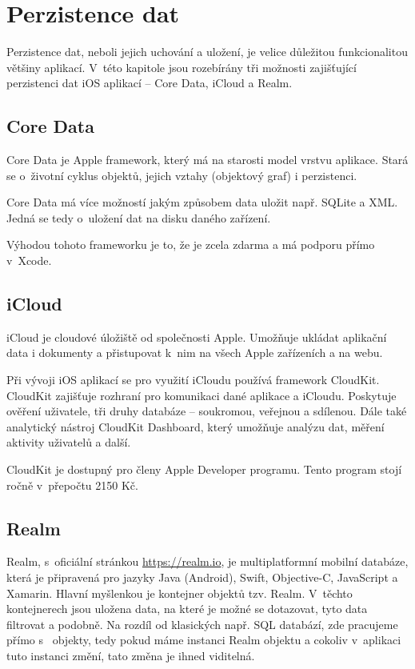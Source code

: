\documentclass[thesis=M,czech]{FITthesis}[2012/06/26]
\begin{document}
\section{Perzistence dat}
Perzistence dat, neboli jejich uchování a uložení, je velice důležitou funkcionalitou většiny aplikací. V~této kapitole jsou rozebírány tři možnosti zajišťující perzistenci dat iOS aplikací -- Core Data, iCloud a Realm.

\subsection{Core Data}
Core Data je Apple framework, který má na starosti model vrstvu aplikace. Stará se o~životní cyklus objektů, jejich vztahy (objektový graf) i perzistenci. \cite{coredata}

Core Data má více možností jakým způsobem data uložit např. SQLite a XML. Jedná se tedy o~uložení dat na disku daného zařízení.  \cite{CoreDataPersistentTypes}

Výhodou tohoto frameworku je to, že je zcela zdarma a má podporu přímo v~Xcode. \cite{CoreDataXcode}

\subsection{iCloud}
iCloud je cloudové úložiště od společnosti Apple. Umožňuje ukládat aplikační data i dokumenty a přistupovat k~nim na všech Apple zařízeních a na webu. \cite{iCloud}

Při vývoji iOS aplikací se pro využití iCloudu používá framework CloudKit. CloudKit zajišťuje rozhraní pro komunikaci dané aplikace a iCloudu. \cite{CloudKitDoc} Poskytuje ověření uživatele, tři druhy databáze -- soukromou, veřejnou a sdílenou. Dále také analytický nástroj CloudKit Dashboard, který umožňuje analýzu dat, měření aktivity uživatelů a další. \cite{CloudKit}

CloudKit je dostupný pro členy Apple Developer programu. \cite{AppleDeveloperProgram} Tento program stojí ročně v~přepočtu 2150 Kč. \cite{AppleDeveloperProgramPrice} 

\subsection{Realm}
Realm, s~oficiální stránkou \url{https://realm.io}, je multiplatformní mobilní databáze, která je připravená pro jazyky Java (Android), Swift, Objective-C, JavaScript a Xamarin. Hlavní myšlenkou je kontejner objektů tzv. Realm. V~těchto kontejnerech jsou uložena data, na které je možné se dotazovat, tyto data filtrovat a podobně. Na rozdíl od klasických např. SQL databází, zde pracujeme přímo s~ objekty, tedy pokud máme instanci Realm objektu a cokoliv v~aplikaci tuto instanci změní, tato změna je ihned viditelná.
\end{document}
